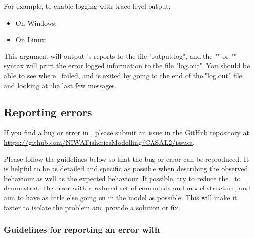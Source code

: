 For example, to enable logging with trace level output:

\begin{itemize}
	\item On Windows: 
	\item On Linux: 
\end{itemize}

This argument will output \CNAME's reports to the file "output.log", and the "" or "" syntax will print the error logged information to the file "log.out". You should be able to see where \CNAME\ failed, and is exited by going to the end of the "log.out" file and looking at the last few messages. 

\subsection{Reporting errors\label{sec:reporting-errors}}

If you find a bug or error in \CNAME, please submit an issue in the GitHub repository at \url{https://github.com/NIWAFisheriesModelling/CASAL2/issues}.

Please follow the guidelines below so that the bug or error can be reproduced. It is helpful to be as detailed and specific as possible when describing the observed behaviour as well as the expected behaviour. If possible, try to reduce the \config\ to demonstrate the error with a reduced set of commands and model structure, and aim to have as little else going on in the model as possible. This will make it faster to isolate the problem and provide a solution or fix.

\subsubsection{Guidelines for reporting an error with \CNAME\label{sec:ErrorGuidelines}}

